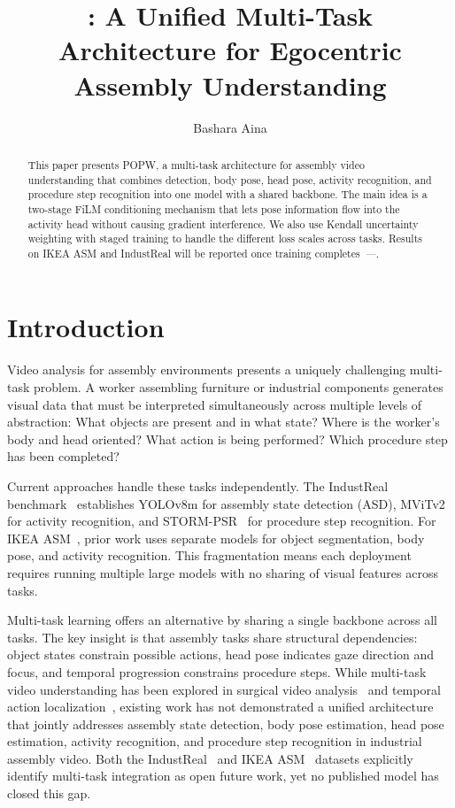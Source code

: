 \documentclass[10pt,twocolumn]{article}
\title{\popw{}: A Unified Multi-Task Architecture for Egocentric Assembly Understanding}
\author{Bashara Aina}
\date{}
\newcommand{\popw}{POPW}
\newcommand{\todo}{\textit{---}}
\newcommand{\popwres}{\todo}
\begin{document}
\maketitle

\begin{abstract}
This paper presents \popw{}, a multi-task architecture for assembly video understanding that combines detection, body pose, head pose, activity recognition, and procedure step recognition into one model with a shared backbone. The main idea is a two-stage FiLM conditioning mechanism that lets pose information flow into the activity head without causing gradient interference. We also use Kendall uncertainty weighting with staged training to handle the different loss scales across tasks. Results on IKEA ASM and IndustReal will be reported once training completes~\popwres.
\end{abstract}

\section{Introduction}
\label{sec:intro}

Video analysis for assembly environments presents a uniquely challenging multi-task problem. A worker assembling furniture or industrial components generates visual data that must be interpreted simultaneously across multiple levels of abstraction: What objects are present and in what state? Where is the worker's body and head oriented? What action is being performed? Which procedure step has been completed?

Current approaches handle these tasks independently. The IndustReal benchmark~\cite{schoonbeek2024industreal} establishes YOLOv8m for assembly state detection (ASD), MViTv2 for activity recognition, and STORM-PSR~\cite{schoonbeek2025storm} for procedure step recognition. For IKEA ASM~\cite{benshabat2021ikea}, prior work uses separate models for object segmentation, body pose, and activity recognition. This fragmentation means each deployment requires running multiple large models with no sharing of visual features across tasks.

Multi-task learning offers an alternative by sharing a single backbone across all tasks. The key insight is that assembly tasks share structural dependencies: object states constrain possible actions, head pose indicates gaze direction and focus, and temporal progression constrains procedure steps. While multi-task video understanding has been explored in surgical video analysis~\cite{kim2025surgical} and temporal action localization~\cite{duong2025multitask}, existing work has not demonstrated a unified architecture that jointly addresses assembly state detection, body pose estimation, head pose estimation, activity recognition, and procedure step recognition in industrial assembly video. Both the IndustReal~\cite{schoonbeek2024industreal} and IKEA ASM~\cite{benshabat2021ikea} datasets explicitly identify multi-task integration as open future work, yet no published model has closed this gap.
\end{document}
